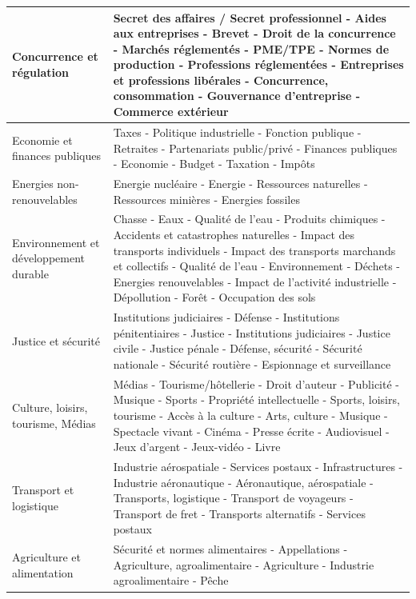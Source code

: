 \documentclass[a4paper,12pt]{article}
\begin{document}
\begin{table}[h]
\begin{tabularx}{\textwidth}{|>{\RaggedRight}X|>{\RaggedRight}p{12cm}|}
\hline
Concurrence et régulation & Secret des affaires / Secret professionnel - Aides aux entreprises - Brevet - Droit de la concurrence - Marchés réglementés - PME/TPE - Normes de production - Professions réglementées - Entreprises et professions libérales - Concurrence, consommation - Gouvernance d’entreprise - Commerce extérieur \\
\hline
Economie et finances publiques & Taxes - Politique industrielle - Fonction publique - Retraites - Partenariats public/privé - Finances publiques - Economie - Budget - Taxation - Impôts \\
\hline
Energies non-renouvelables & Energie nucléaire - Energie - Ressources naturelles - Ressources minières - Energies fossiles \\
\hline
Environnement et développement durable & Chasse - Eaux - Qualité de l'eau - Produits chimiques - Accidents et catastrophes naturelles - Impact des transports individuels - Impact des transports marchands et collectifs - Qualité de l'eau - Environnement - Déchets - Energies renouvelables - Impact de l'activité industrielle - Dépollution - Forêt - Occupation des sols \\
\hline
Justice et sécurité & Institutions judiciaires - Défense - Institutions pénitentiaires - Justice - Institutions judiciaires - Justice civile - Justice pénale - Défense, sécurité - Sécurité nationale - Sécurité routière - Espionnage et surveillance \\
\hline
Culture, loisirs, tourisme, Médias & Médias - Tourisme/hôtellerie - Droit d'auteur - Publicité - Musique - Sports - Propriété intellectuelle - Sports, loisirs, tourisme - Accès à la culture - Arts, culture - Musique - Spectacle vivant - Cinéma - Presse écrite - Audiovisuel - Jeux d'argent - Jeux-vidéo - Livre \\
\hline
Transport et logistique & Industrie aérospatiale - Services postaux - Infrastructures - Industrie aéronautique - Aéronautique, aérospatiale - Transports, logistique - Transport de voyageurs - Transport de fret - Transports alternatifs - Services postaux \\
\hline
Agriculture et alimentation & Sécurité et normes alimentaires - Appellations - Agriculture, agroalimentaire - Agriculture - Industrie agroalimentaire - Pêche \\
\hline\end{tabularx}
\end{table}
 
\end{document}
